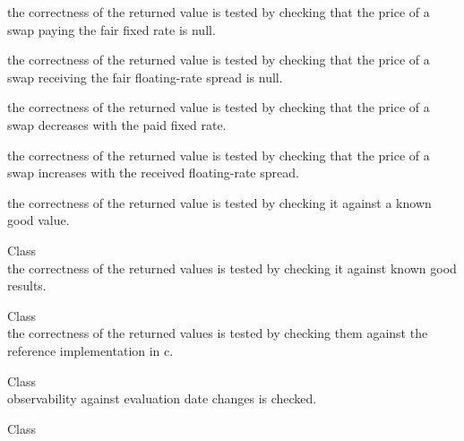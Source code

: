 \begin{DoxyRefList}
\begin{DoxyItemize}
\item the correctness of the returned value is tested by checking that the price of a swap paying the fair fixed rate is null.
\item the correctness of the returned value is tested by checking that the price of a swap receiving the fair floating-\/rate spread is null.
\item the correctness of the returned value is tested by checking that the price of a swap decreases with the paid fixed rate.
\item the correctness of the returned value is tested by checking that the price of a swap increases with the received floating-\/rate spread.
\item the correctness of the returned value is tested by checking it against a known good value. 
\end{DoxyItemize}
\item[Class \doxylink{class_quant_lib_1_1_variance_gamma_engine}{Quant\+Lib\+::Variance\+Gamma\+Engine} ]\hfill \\
\label{test__test000013}%
%
the correctness of the returned values is tested by checking it against known good results.  
\item[Class \doxylink{class_quant_lib_1_1_xoshiro256_star_star_uniform_rng}{Quant\+Lib\+::Xoshiro256\+Star\+Star\+Uniform\+Rng} ]\hfill \\
\label{test__test000065}%
%
the correctness of the returned values is tested by checking them against the reference implementation in c.  
\item[Class \doxylink{class_quant_lib_1_1_yield_term_structure}{Quant\+Lib\+::Yield\+Term\+Structure} ]\hfill \\
\label{test__test000169}%
%
observability against evaluation date changes is checked.  
\item[Class \doxylink{class_quant_lib_1_1_yo_y_inflation_cap_floor}{Quant\+Lib\+::Yo\+YInflation\+Cap\+Floor} ]\hfill \\
\label{test__test000024}%
%


\end{DoxyRefList}
